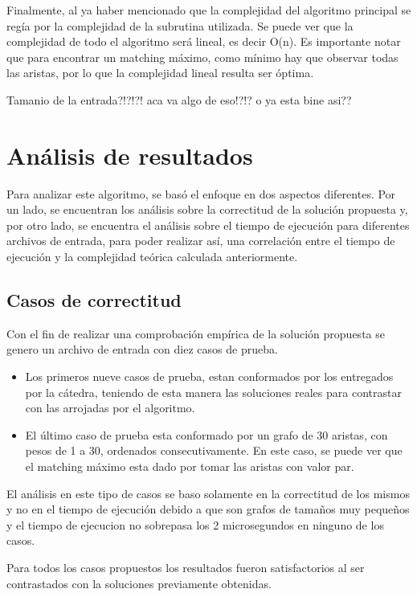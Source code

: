\documentclass[a4paper, 12pt]{article}
\begin{document}
Finalmente, al ya haber mencionado que la complejidad del algoritmo principal se reg\'ia por la complejidad de la subrutina utilizada. Se puede ver que la complejidad de todo el algoritmo ser\'a lineal, es decir O(n). Es importante notar que para encontrar un matching m\'aximo, como m\'inimo hay que observar todas las aristas, por lo que la complejidad lineal resulta ser \'optima.

Tamanio de la entrada?!?!?! aca va algo de eso!?!? o ya esta bine asi??


\section*{An\'alisis de resultados}

Para analizar este algoritmo, se bas\'o el enfoque en dos aspectos diferentes. Por un lado, se encuentran los an\'alisis sobre la correctitud de la soluci\'on propuesta y, por otro lado, se encuentra el an\'alisis sobre el tiempo de ejecuci\'on para diferentes archivos de entrada, para poder realizar as\'i, una correlaci\'on entre el tiempo de ejecuci\'on y la complejidad te\'orica calculada anteriormente.

\subsection*{Casos de correctitud}
Con el fin de realizar una comprobaci\'on emp\'irica de la soluci\'on propuesta se genero un archivo de entrada con diez casos de prueba.
\begin{itemize}
\item Los primeros nueve casos de prueba, estan conformados por los entregados por la c\'atedra, teniendo de esta manera las soluciones reales para contrastar con las arrojadas por el algoritmo.
\item El \'ultimo caso de prueba esta conformado por un grafo de 30 aristas, con pesos de 1 a 30, ordenados consecutivamente. En este caso, se puede ver que el matching m\'aximo esta dado por tomar las aristas con valor par.
\end{itemize}

El an\'alisis en este tipo de casos se baso solamente en la correctitud de los mismos y no en el tiempo de ejecuci\'on debido a que son grafos de tama\~{n}os muy peque\~{n}os y el tiempo de ejecucion no sobrepasa los 2 microsegundos en ninguno de los casos.

Para todos los casos propuestos los resultados fueron satisfactorios al ser contrastados con la soluciones previamente obtenidas.
\end{document}

